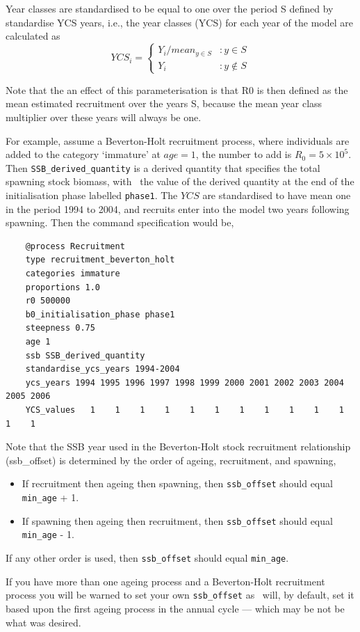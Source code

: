 Year classes are standardised to be equal to one over the period S defined by standardise YCS years, i.e., the year classes (YCS) for each year of the model are calculated as
\[
YCS_i = 
\begin{cases}
Y_i / mean_{y \in S} & :y \in S\\
Y_i					 & :y \notin S
\end{cases}
\]

Note that the an effect of this parameterisation is that R0 is then defined as the mean estimated recruitment over the years S, because the mean year class multiplier over these years will always be one.

For example, assume a Beverton-Holt recruitment process, where individuals are added to the category `immature' at $age=1$, the number to add is $R_0=5 \times 10^5$. Then \texttt{SSB\_derived\_quantity} is a derived quantity that specifies the total spawning stock biomass, with \Bzero\ the value of the derived quantity at the end of the initialisation phase labelled \texttt{phase1}. The $YCS$ are standardised to have mean one in the period 1994 to 2004, and recruits enter into the model two years following spawning. Then the command specification would be,

{\small{\begin{verbatim}
	@process Recruitment
	type recruitment_beverton_holt
	categories immature
	proportions 1.0
	r0 500000
	b0_initialisation_phase phase1
	steepness 0.75
	age 1
	ssb SSB_derived_quantity
	standardise_ycs_years 1994-2004
	ycs_years 1994 1995 1996 1997 1998 1999 2000 2001 2002 2003 2004 2005 2006
	YCS_values   1    1    1    1    1    1    1    1    1    1    1    1    1
\end{verbatim}}}

Note that the SSB year used in the Beverton-Holt stock recruitment relationship (ssb\_offset) is determined by the order of ageing, recruitment, and spawning, 
\begin{itemize}
	\item If recruitment then ageing then spawning, then \texttt{ssb\_offset} should equal \texttt{min\_age} + 1.
	\item If spawning then ageing then recruitment, then \texttt{ssb\_offset} should equal \texttt{min\_age} - 1.
\end{itemize}

If any other order is used, then \texttt{ssb\_offset} should equal \texttt{min\_age}.

If you have more than one ageing process and a Beverton-Holt recruitment process you will be warned to set your own \texttt{ssb\_offset} as \CNAME\ will, by default, set it based upon the first ageing process in the annual cycle --- which may be not be what was desired.

